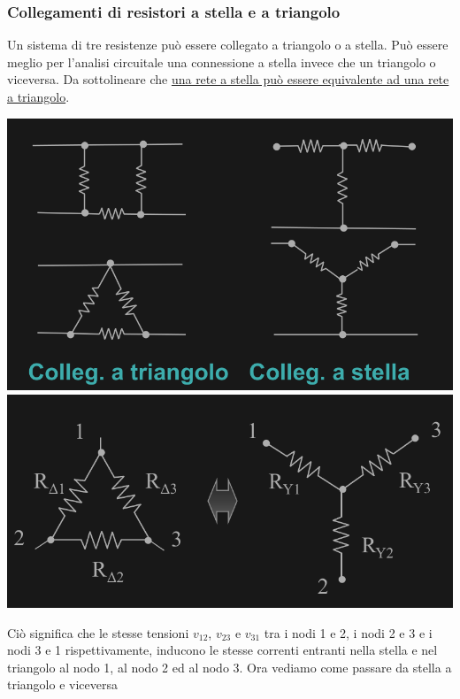 \documentclass{article}
\begin{document}
\subsubsection{Collegamenti di resistori a stella e a triangolo}
Un sistema di tre resistenze
può essere collegato a
triangolo o a stella. Può essere
meglio per l'analisi circuitale
una connessione a stella invece
che un triangolo o viceversa.
Da sottolineare che \ul{una rete a stella può essere equivalente ad una rete a triangolo}.
\begin{center}
    \includegraphics[scale=0.3]{Image/Stella triangolo.png}
    \includegraphics[scale=0.3]{Image/Nodi triangolo stella.png}
\end{center}
Ciò significa che le stesse tensioni $v_{12}$, $v_{23}$ e $v_{31}$ tra i nodi 1 e
2, i nodi 2 e 3 e i nodi 3 e 1 rispettivamente, inducono le
stesse correnti entranti nella
stella e nel triangolo al nodo 1,
al nodo 2 ed al nodo 3.
Ora vediamo come passare da stella a triangolo e viceversa
\end{document}
